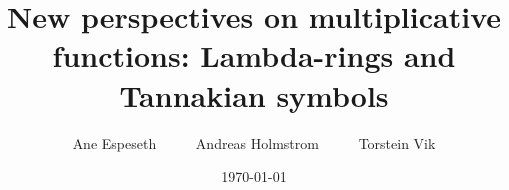 \documentclass[a4paper]{article}
\title{New perspectives on multiplicative functions: Lambda-rings and Tannakian symbols}
\author{Ane Espeseth \ \ \ \ \ Andreas Holmstrom \ \ \ \ \ Torstein Vik}
\date{\today}
\begin{document}





















\nocite{*} %
{}
\end{document}

